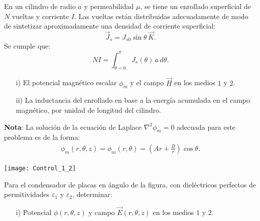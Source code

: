 \documentclass[
  11pt,
  letterpaper,
   addpoints,
  ]{exam}
\begin{document}
\begin{questions}
    \question     
    En un cilindro de radio \( a \) y permeabilidad \( \mu \), se tiene un enrollado superficial de \( N \) vueltas y corriente \( I \). Las vueltas están distribuidas adecuadamente de modo de sintetizar aproximadamente una densidad de corriente superficial:
    \begin{equation}
    \vec{J}_s = J_{s0} \sin\theta\, \vec{K}.
    \end{equation}
    Se cumple que:
    \begin{equation}
    NI = \int_{\theta=0}^{\pi} J_s(\theta)\, a\, d\theta.
    \end{equation}
    
    \begin{enumerate}
        \item[i)] El potencial magnético escalar \( \phi_m \) y el campo \( \vec{H} \) en los medios \( 1 \) y \( 2 \).
        \item[ii)] La inductancia del enrollado en base a la energía acumulada en el campo magnético, por unidad de longitud del cilindro.
    \end{enumerate}
    
    \noindent\textbf{Nota}: La solución de la ecuación de Laplace \( \nabla^2 \phi_m = 0 \) adecuada para este problema es de la forma:
    \begin{align}
    \phi_m(r,\theta,z) = \phi_m(r,\theta) = \left( A r + \frac{B}{r} \right) \cos\theta.
    \end{align}
    
\begin{center}
    \texttt{[image: Control\_1\_2]}
\end{center}
    \begin{solution}
   
    \end{solution}
    \newpage
    \question  
   
    Para el condensador de placas en ángulo de la figura, con dieléctricos perfectos de permitividades \( \varepsilon_1 \) y \( \varepsilon_2 \), determinar:

    \begin{enumerate}
        \item[i)] Potencial \( \phi(r,\theta,z) \) y campo \( \vec{E}(r,\theta,z) \) en los medios \( 1 \) y \( 2 \).


\end{enumerate}
\end{questions}
\end{document}
